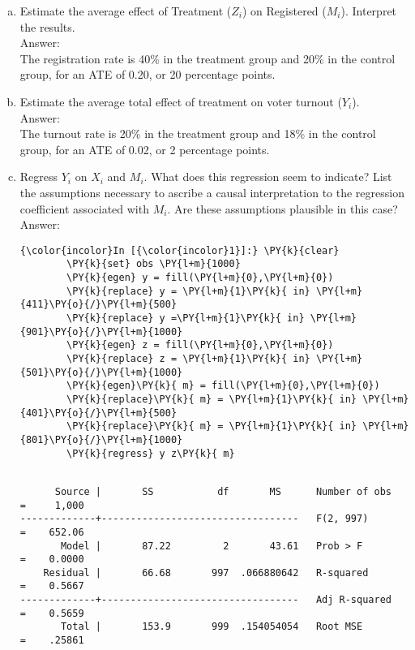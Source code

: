 \documentclass[11pt,notitlepage]{article}\usepackage[]{graphicx}\usepackage[]{color}
\makeatletter
\newenvironment{kframe}{%
 \def\at@end@of@kframe{}%
 \ifinner\ifhmode%
  \def\at@end@of@kframe{\end{minipage}}%
  \begin{minipage}{\columnwidth}%
 \fi\fi%
 \def\FrameCommand##1{\hskip\@totalleftmargin \hskip-\fboxsep
 \colorbox{shadecolor}{##1}\hskip-\fboxsep
     \hskip-\linewidth \hskip-\@totalleftmargin \hskip\columnwidth}%
 \MakeFramed {\advance\hsize-\width
   \@totalleftmargin\z@ \linewidth\hsize
   \@setminipage}}%
 {\par\unskip\endMakeFramed%
 \at@end@of@kframe}
\newenvironment{knitrout}{}{} %
\makeatother
\begin{document}
\begin{enumerate}[a)]
\item Estimate the average effect of Treatment ($Z_i$) on Registered ($M_i$). Interpret the results. \\
Answer:\\
The registration rate is 40\% in the treatment group and 20\% in the control group, for an ATE of 0.20, or 20 percentage points.

\item Estimate the average total effect of treatment on voter turnout ($Y_i$).\\
Answer:\\
The turnout rate is 20\% in the treatment group and 18\% in the control group, for an ATE of 0.02, or 2 percentage points. 

\item Regress $Y_i$ on $X_i$ and $M_i$. What does this regression seem to indicate? List the assumptions necessary to ascribe a causal interpretation to the regression coefficient associated with $M_i$. Are these assumptions plausible in this case?\\
Answer:\\

\begin{knitrout}
\color{fgcolor}\begin{kframe}
    \begin{Verbatim}[commandchars=\\\{\}]
{\color{incolor}In [{\color{incolor}1}]:} \PY{k}{clear}
        \PY{k}{set} obs \PY{l+m}{1000}
        \PY{k}{egen} y = fill(\PY{l+m}{0},\PY{l+m}{0})
        \PY{k}{replace} y = \PY{l+m}{1}\PY{k}{ in} \PY{l+m}{411}\PY{o}{/}\PY{l+m}{500}
        \PY{k}{replace} y =\PY{l+m}{1}\PY{k}{ in} \PY{l+m}{901}\PY{o}{/}\PY{l+m}{1000}
        \PY{k}{egen} z = fill(\PY{l+m}{0},\PY{l+m}{0})
        \PY{k}{replace} z = \PY{l+m}{1}\PY{k}{ in} \PY{l+m}{501}\PY{o}{/}\PY{l+m}{1000}
        \PY{k}{egen}\PY{k}{ m} = fill(\PY{l+m}{0},\PY{l+m}{0})
        \PY{k}{replace}\PY{k}{ m} = \PY{l+m}{1}\PY{k}{ in} \PY{l+m}{401}\PY{o}{/}\PY{l+m}{500}
        \PY{k}{replace}\PY{k}{ m} = \PY{l+m}{1}\PY{k}{ in} \PY{l+m}{801}\PY{o}{/}\PY{l+m}{1000}
        \PY{k}{regress} y z\PY{k}{ m}
\end{Verbatim}

    \begin{Verbatim}[commandchars=\\\{\}]

      Source |       SS           df       MS      Number of obs   =     1,000
-------------+----------------------------------   F(2, 997)       =    652.06
       Model |       87.22         2       43.61   Prob > F        =    0.0000
    Residual |       66.68       997  .066880642   R-squared       =    0.5667
-------------+----------------------------------   Adj R-squared   =    0.5659
       Total |       153.9       999  .154054054   Root MSE        =    .25861


\end{Verbatim}
\end{kframe}
\end{knitrout}
\end{enumerate}
\end{document}
